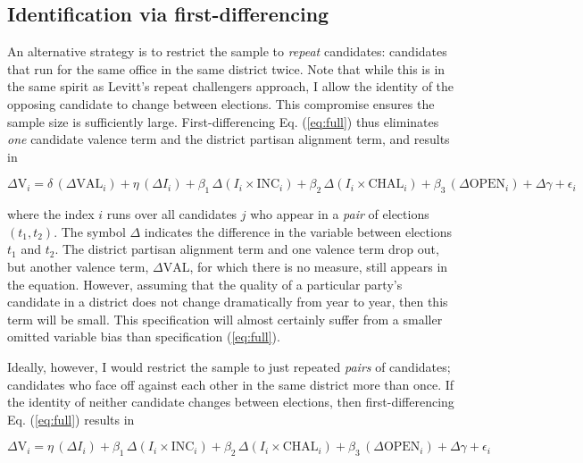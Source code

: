 \documentclass{article}
\begin{document}
\subsection{Identification via first-differencing}

An alternative strategy is to restrict the sample to \textit{repeat} candidates: candidates that run for the same office in the same district twice. Note that while this is in the same spirit as Levitt's repeat challengers approach, I allow the identity of the opposing candidate to change between elections. This compromise ensures the sample size is sufficiently large. First-differencing Eq. (\ref{eq:full}) thus eliminates \textit{one} candidate valence term and the district partisan alignment term, and results in

\begin{equation}
\Delta \text{V}_{i} = \delta \, (\Delta \text{VAL}_i) + \eta \, (\Delta I_{i}) + \beta_1 \, \Delta (I_i \times \text{INC}_{i}) + \beta_2 \, \Delta (I_i \times \text{CHAL}_{i}) + \beta_3 \, (\Delta \text{OPEN}_{i}) + \Delta \gamma + \epsilon_{i}
\label{eq:diff1}
\end{equation}

where the index $i$ runs over all candidates $j$ who appear in a \textit{pair} of elections $(t_1, t_2)$. The symbol $\Delta$ indicates the difference in the variable between elections $t_1$ and $t_2$. The district partisan alignment term and one valence term drop out, but another valence term, $\Delta \text{VAL}$, for which there is no measure, still appears in the equation. However, assuming that the quality of a particular party's candidate in a district does not change dramatically from year to year, then this term will be small. This specification will almost certainly suffer from a smaller omitted variable bias than specification (\ref{eq:full}).

Ideally, however, I would restrict the sample to just repeated \textit{pairs} of candidates; candidates who face off against each other in the same district more than once. If the identity of neither candidate changes between elections, then first-differencing Eq. (\ref{eq:full}) results in

\begin{equation}
\Delta \text{V}_{i} = \eta \, (\Delta I_{i}) + \beta_1 \, \Delta (I_i \times \text{INC}_{i}) + \beta_2 \, \Delta (I_i \times \text{CHAL}_{i}) + \beta_3 \, (\Delta \text{OPEN}_{i}) + \Delta \gamma + \epsilon_{i}
\label{eq:diff2}
\end{equation}
\end{document}
